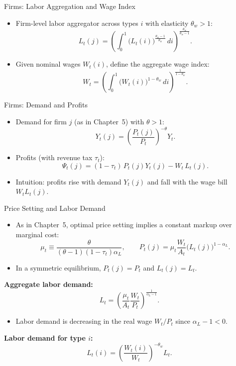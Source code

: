 \documentclass[11pt,aspectratio=169]{beamer}
\begin{document}
\begin{frame}{Firms: Labor Aggregation and Wage Index}
\small
\begin{itemize}
  \item Firm-level labor aggregator across types \(i\) with elasticity \(\theta_w>1\):
  \[
  L_t(j)=\left(\int_0^1 \big(L_t(i)\big)^{\frac{\theta_w-1}{\theta_w}}\,di\right)^{\frac{\theta_w}{\theta_w-1}}.
  \]
  \item Given nominal wages \(W_t(i)\), define the aggregate wage index:
  \[
  W_t=\left(\int_0^1 \big(W_t(i)\big)^{1-\theta_w}\,di\right)^{\frac{1}{1-\theta_w}}.
  \]
\end{itemize}
\end{frame}

\begin{frame}{Firms: Demand and Profits}
\small
\begin{itemize}
  \item Demand for firm \(j\) (as in Chapter~5) with \(\theta>1\):
  \[
    Y_t(j)=\left(\frac{P_t(j)}{P_t}\right)^{-\theta}Y_t .
  \]
  \item Profits (with revenue tax \(\tau_t\)):
  \[
    \Psi_t(j)=(1-\tau_t)\,P_t(j)Y_t(j)-W_t\,L_t(j).
  \]
  \item Intuition: profits rise with demand \(Y_t(j)\) and fall with the wage bill \(W_tL_t(j)\).
\end{itemize}
\end{frame}

\begin{frame}{Price Setting and Labor Demand}
\small
\begin{itemize}
  \item As in Chapter~5, optimal price setting implies a constant markup over marginal cost:
  \[
  \mu_t \equiv \frac{\theta}{(\theta-1)(1-\tau_t)\alpha_L},
  \qquad
  P_t(j)=\mu_t\frac{W_t}{A_t}\big(L_t(j)\big)^{1-\alpha_L}.
  \]
  \item In a symmetric equilibrium, \(P_t(j)=P_t\) and \(L_t(j)=L_t\).
\end{itemize}

\vspace{0.2cm}
\textbf{Aggregate labor demand:}
\begin{equation}
L_{t}=\left( \frac{\mu _{t}}{A_{t}}\frac{W_{t}}{P_{t}}\right) ^{\frac{1}{\alpha _{L}-1}}.
\label{eq3}
\end{equation}
\begin{itemize}
  \item Labor demand is decreasing in the real wage \(W_t/P_t\) since \(\alpha_L-1<0\).
\end{itemize}

\vspace{0.2cm}
\textbf{Labor demand for type \(i\):}
\begin{equation}
L_{t}(i)=\left( \frac{W_{t}(i)}{W_{t}}\right) ^{-\theta _{w}}L_{t}.
\label{eq4}
\end{equation}
\end{frame}
\end{document}
